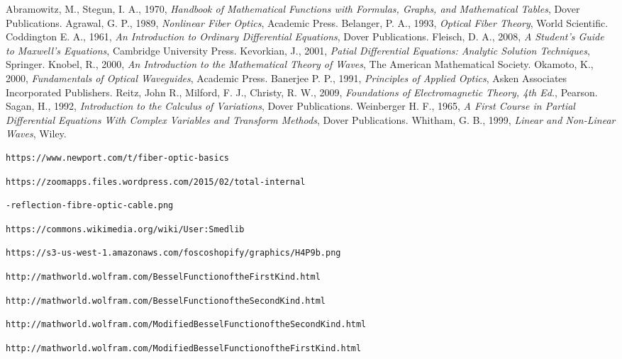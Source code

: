 \documentclass[12pt]{article}
\theoremstyle{definition}
\numberwithin{equation}{section}
\begin{document}
{\begin{thebibliography}{99}
 Abramowitz, M., Stegun, I. A., 1970, {\it Handbook of Mathematical Functions with Formulas, Graphs, and Mathematical Tables}, Dover Publications.
 Agrawal, G. P., 1989, {\it Nonlinear Fiber Optics}, Academic Press.
 Belanger, P. A., 1993, {\it Optical Fiber Theory}, World Scientific.
 Coddington E. A., 1961, {\it An Introduction to Ordinary Differential Equations}, Dover Publications.
 Fleisch, D. A., 2008, {\it A Student's Guide to Maxwell's Equations}, Cambridge University Press.
 Kevorkian, J., 2001, {\it Patial Differential Equations: Analytic Solution Techniques}, Springer.
 Knobel, R., 2000, {\it An Introduction to the Mathematical Theory of Waves}, The American Mathematical Society.
 Okamoto, K., 2000,  {\it Fundamentals of Optical Waveguides}, Academic Press.
 Banerjee P. P., 1991, {\it Principles of Applied Optics}, Asken Associates Incorporated Publishers.
 Reitz, John R., Milford, F. J., Christy, R. W., 2009, {\it Foundations of Electromagnetic Theory, 4th Ed.}, Pearson.
 Sagan, H., 1992, {\it Introduction to the Calculus of Variations}, Dover Publications.
 Weinberger H. F., 1965, {\it A First Course in Partial Differential Equations With Complex Variables and Transform Methods}, Dover Publications.
 Whitham, G. B., 1999, {\it Linear and Non-Linear Waves}, Wiley.
\begin{verbatim}https://www.newport.com/t/fiber-optic-basics\end{verbatim}
\begin{verbatim}
https://zoomapps.files.wordpress.com/2015/02/total-internal\end{verbatim}\vspace{-5mm}\begin{verbatim}-reflection-fibre-optic-cable.png\end{verbatim}
\begin{verbatim}https://commons.wikimedia.org/wiki/User:Smedlib\end{verbatim}
\begin{verbatim}https://s3-us-west-1.amazonaws.com/foscoshopify/graphics/H4P9b.png\end{verbatim}
\begin{verbatim}http://mathworld.wolfram.com/BesselFunctionoftheFirstKind.html\end{verbatim}
\begin{verbatim}http://mathworld.wolfram.com/BesselFunctionoftheSecondKind.html\end{verbatim}
\begin{verbatim}http://mathworld.wolfram.com/ModifiedBesselFunctionoftheSecondKind.html\end{verbatim}
\begin{verbatim}http://mathworld.wolfram.com/ModifiedBesselFunctionoftheFirstKind.html\end{verbatim}



\end{thebibliography}}
\end{document}
